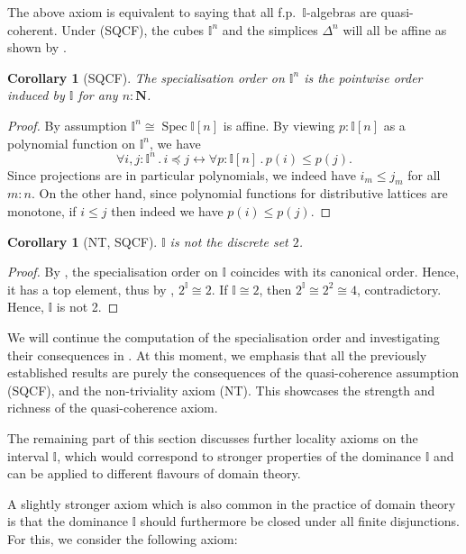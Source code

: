 \documentclass[12pt]{amsart}
\newtheorem{corollary}[theorem]{Corollary}
\theoremstyle{definition}
\newcommand{\mb}[1]{\mathbf{#1}}
\newcommand{\mbb}[1]{\mathbb{#1}}
\newcommand{\I}{\mbb I}
\newcommand{\N}{\mb N}
\newcommand{\fa}[2]{\forall #1\!\colon\!\!#2\mathpunct{.}}
\newcommand{\eq}{\leftrightarrow}
\newcommand{\spec}{\operatorname{Spec}}
\begin{document}
The above axiom is equivalent to saying that all f.p.\ $\I$-algebras are quasi-coherent. 
Under (SQCF), the cubes $\I^n$ and the simplices $\Delta^n$ will all be affine as shown by .

\begin{corollary}[SQCF]\label{cor:pointwisecubeorder}
  The specialisation order on $\I^n$ is the pointwise order induced by $\I$ for any $n : \N$.
\end{corollary}
\begin{proof}
  By assumption $\I^n \cong \spec\I[n]$ is affine. By viewing $p : \I[n]$ as a polynomial function on $\I^n$, we have
  \[ \fa{i,j}{\I^n} i \preceq j \eq \fa p{\I[n]} p(i) \le p(j). \]
  Since projections are in particular polynomials, we indeed have $i_m \le j_m$ for all $m : n$. On the other hand, since polynomial functions for distributive lattices are monotone, if $i \le j$ then indeed we have $p(i) \le p(j)$. 
\end{proof}

\begin{corollary}[NT, SQCF]\label{cor:intisnot2}
  $\I$ is not the discrete set $2$.
\end{corollary}
\begin{proof}
  By , the specialisation order on $\I$ coincides with its canonical order. Hence, it has a top element, thus by , $2^\I \cong 2$. If $\I \cong 2$, then $2^\I \cong 2^2 \cong 4$, contradictory. Hence, $\I$ is not 2.
\end{proof}

We will continue the computation of the specialisation order and investigating their consequences in . At this moment, we emphasis that all the previously established results are purely the consequences of the quasi-coherence assumption (SQCF), and the non-triviality axiom (NT). This showcases the strength and richness of the quasi-coherence axiom.

The remaining part of this section discusses further locality axioms on the interval $\I$, which would correspond to stronger properties of the dominance $\I$ and can be applied to different flavours of domain theory. 

A slightly stronger axiom which is also common in the practice of domain theory is that the dominance $\I$ should furthermore be closed under all finite disjunctions. For this, we consider the following axiom:
\end{document}
